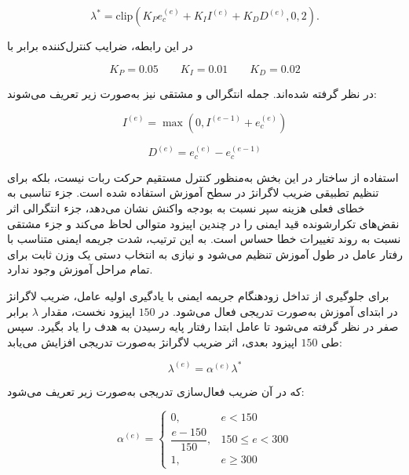 \begin{equation}
	\lambda^{*} =
	\mathrm{clip}
	\left(
	K_P e_c^{(e)}
	+
	K_I I^{(e)}
	+
	K_D D^{(e)},
	0,
	2
	\right).
	\label{eq:pid_lambda_raw_final}
\end{equation}

در این رابطه، ضرایب کنترل‌کننده برابر با

\begin{equation}
	K_P=0.05
	\qquad
	K_I=0.01
	\qquad
	K_D=0.02
	\label{eq:pid_gains_final}
\end{equation}

در نظر گرفته شده‌اند. جمله انتگرالی و مشتقی نیز به‌صورت زیر تعریف می‌شوند:

\begin{equation}
	I^{(e)}
	=
	\max
	\left(
	0,
	I^{(e-1)}+e_c^{(e)}
	\right)
	\label{eq:pid_integral_final}
\end{equation}

\begin{equation}
	D^{(e)}
	=
	e_c^{(e)}
	-
	e_c^{(e-1)}
	\label{eq:pid_derivative_final}
\end{equation}

استفاده از ساختار  در این بخش به‌منظور کنترل مستقیم حرکت ربات نیست، بلکه برای تنظیم تطبیقی ضریب لاگرانژ در سطح آموزش استفاده شده است. جزء تناسبی به خطای فعلی هزینه سپر نسبت به بودجه واکنش نشان می‌دهد، جزء انتگرالی اثر نقض‌های تکرارشونده قید ایمنی را در چندین اپیزود متوالی لحاظ می‌کند و جزء مشتقی نسبت به روند تغییرات خطا حساس است. به این ترتیب، شدت جریمه ایمنی متناسب با رفتار عامل در طول آموزش تنظیم می‌شود و نیازی به انتخاب دستی یک وزن ثابت برای تمام مراحل آموزش وجود ندارد.

برای جلوگیری از تداخل زودهنگام جریمه ایمنی با یادگیری اولیه عامل، ضریب لاگرانژ در ابتدای آموزش به‌صورت تدریجی فعال می‌شود. در \(150\) اپیزود نخست، مقدار \(\lambda\) برابر صفر در نظر گرفته می‌شود تا عامل ابتدا رفتار پایه رسیدن به هدف را یاد بگیرد. سپس طی \(150\) اپیزود بعدی، اثر ضریب لاگرانژ به‌صورت تدریجی افزایش می‌یابد:

\begin{equation}
	\lambda^{(e)}
	=
	\alpha^{(e)} \lambda^{*}
	\label{eq:lambda_ramp_final}
\end{equation}

که در آن ضریب فعال‌سازی تدریجی به‌صورت زیر تعریف می‌شود:

\begin{equation}
	\alpha^{(e)}
	=
	\begin{cases}
		0,
		& e < 150\\
		\dfrac{e-150}{150},
		& 150 \le e < 300\\
		1,
		& e \ge 300
	\end{cases}
	\label{eq:lambda_warmup_ramp_final}
\end{equation}

